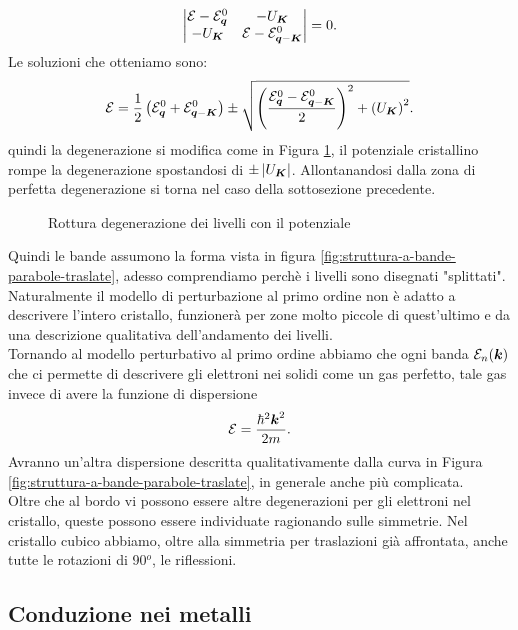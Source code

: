 \[
	\begin{vmatrix}
		\mathcal{E}-\mathcal{E}^0_{\boldsymbol{q}} & -U_{\boldsymbol{K}} \\
		-U_{\boldsymbol{K}} & \mathcal{E}-\mathcal{E}^0_{\boldsymbol{q}-\boldsymbol{K}}
	\end{vmatrix} 
	=
	0
.\] 
Le soluzioni che otteniamo sono:
\[\begin{aligned}
	\mathcal{E}  = \frac{1}{2}\left( \mathcal{E}^0_{\boldsymbol{q}} 
		+ 
	\mathcal{E}^0_{\boldsymbol{q}-\boldsymbol{K}} \right) 
	\pm
	\sqrt{\left( 
	\frac{\mathcal{E}^0_{\boldsymbol{q}}-\mathcal{E}^0_{\boldsymbol{q}-\boldsymbol{K}}}{2} \right) ^2
		+ 
	\left( U_{\boldsymbol{K}} \right)^2} 
.\end{aligned}\]
quindi la degenerazione si modifica come in Figura  \ref{fig:rottura-degenerazione-dei-livelli-con-il-potenziale}, il potenziale cristallino rompe la degenerazione spostandosi di $ \pm \left| U_{\boldsymbol{K}} \right|$. Allontanandosi dalla zona di perfetta degenerazione si torna nel caso della sottosezione precedente.
\begin{figure}[ht]
    \centering
    \caption{Rottura degenerazione dei livelli con il potenziale}
    \label{fig:rottura-degenerazione-dei-livelli-con-il-potenziale}
\end{figure}
Quindi le bande assumono la forma vista in figura \ref{fig:struttura-a-bande-parabole-traslate}, adesso comprendiamo perchè i livelli sono disegnati "splittati".\\
Naturalmente il modello di perturbazione al primo ordine non è adatto a descrivere l'intero cristallo, funzionerà per zone molto piccole di quest'ultimo e da una descrizione qualitativa dell'andamento dei livelli.\\
Tornando al modello perturbativo al primo ordine abbiamo che ogni banda $\mathcal{E}_n(\boldsymbol{k})$ che ci permette di descrivere gli elettroni nei solidi come un gas perfetto, tale gas invece di avere la funzione di dispersione 
\[
	\mathcal{E}  = \frac{\hbar ^2 \boldsymbol{k}^2}{2m}
.\] 
Avranno un'altra dispersione descritta qualitativamente dalla curva in Figura \ref{fig:struttura-a-bande-parabole-traslate}, in generale anche più complicata. \\
Oltre che al bordo vi possono essere altre degenerazioni per gli elettroni nel cristallo, queste possono essere individuate ragionando sulle simmetrie. Nel cristallo cubico abbiamo, oltre alla simmetria per traslazioni già affrontata, anche tutte le rotazioni di 90$^o$, le riflessioni. \\
\subsection{Conduzione nei metalli}
\label{subsec:Conduzione nei metalli}
